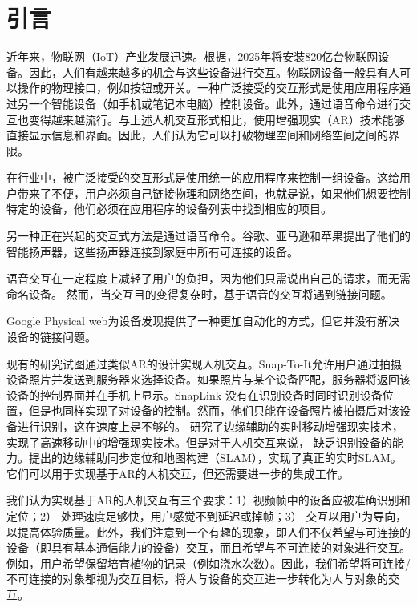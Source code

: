 


\chapter{引言}

近年来，物联网（IoT）产业发展迅速。根据\cite{macgillivray2019worldwide}，2025年将安装820亿台物联网设备。因此，人们有越来越多的机会与这些设备进行交互。物联网设备一般具有人可以操作的物理接口，例如按钮或开关。一种广泛接受的交互形式是使用应用程序通过另一个智能设备（如手机或笔记本电脑）控制设备\cite{homeass,xiaomi}。此外，通过语音命令进行交互也变得越来越流行\cite{li2019iot,porcheron2018voice}。与上述人机交互形式相比，使用增强现实（AR）技术能够直接显示信息和界面。因此，人们认为它可以打破物理空间和网络空间之间的界限。

在行业中，被广泛接受的交互形式是使用统一的应用程序来控制一组设备。这给用户带来了不便，用户必须自己链接物理和网络空间，也就是说，如果他们想要控制特定的设备，他们必须在应用程序的设备列表中找到相应的项目。

另一种正在兴起的交互式方法是通过语音命令。谷歌、亚马逊和苹果提出了他们的智能扬声器，这些扬声器连接到家庭中所有可连接的设备。

语音交互在一定程度上减轻了用户的负担，因为他们只需说出自己的请求，而无需命名设备。
然而，当交互目的变得复杂时，基于语音的交互将遇到链接问题。

Google Physical web\cite{jenson2014physical}为设备发现提供了一种更加自动化的方式，但它并没有解决设备的链接问题。

现有的研究试图通过类似AR的设计实现人机交互\cite{de2016snap,chen2018snaplink}。Snap-To-It\cite{de2016snap}允许用户通过拍摄设备照片并发送到服务器来选择设备。如果照片与某个设备匹配，服务器将返回该设备的控制界面并在手机上显示。SnapLink\cite{chen2018snaplink} 没有在识别设备时同时识别设备位置，但是也同样实现了对设备的控制。然而，他们只能在设备照片被拍摄后对该设备进行识别，这在速度上是不够的。\cite{liu2019edge} 研究了边缘辅助的实时移动增强现实技术，实现了高速移动中的增强现实技术。但是对于人机交互来说，\cite{liu2019edge} 缺乏识别设备的能力。\cite{ben2020edge,xu2020edge,liu2021edgesharing}提出的边缘辅助同步定位和地图构建（SLAM），实现了真正的实时SLAM。它们可以用于实现基于AR的人机交互，但还需要进一步的集成工作。

我们认为实现基于AR的人机交互有三个要求：1）视频帧中的设备应被准确识别和定位；2） 处理速度足够快，用户感觉不到延迟或掉帧；3） 交互以用户为导向，以提高体验质量。此外，我们注意到一个有趣的现象，即人们不仅希望与可连接的设备（即具有基本通信能力的设备）交互，而且希望与不可连接的对象进行交互。例如，用户希望保留培育植物的记录（例如浇水次数）。因此，我们希望将可连接/不可连接的对象都视为交互目标，将人与设备的交互进一步转化为人与对象的交互。

